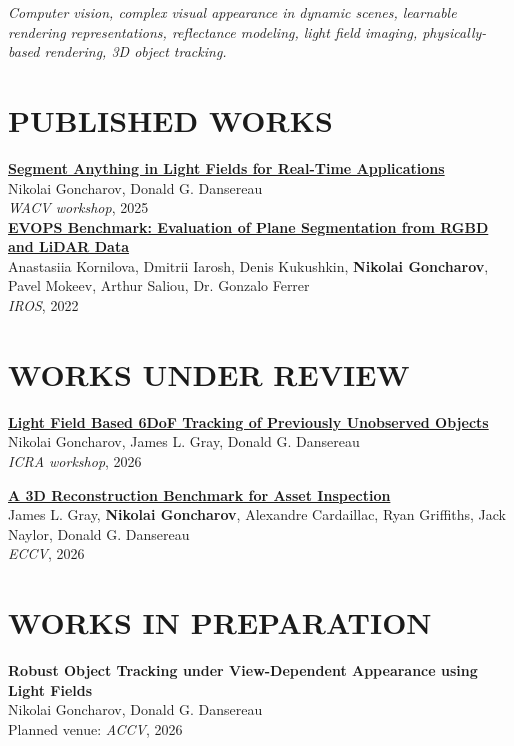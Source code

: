 \documentclass[11pt,a4paper]{article}
\begin{document}
\textit{Computer vision, complex visual appearance in dynamic scenes, learnable rendering representations, reflectance modeling, light field imaging, physically-based rendering, 3D object tracking.}

\section*{PUBLISHED WORKS}
\textbf{\href{https://openaccess.thecvf.com/content/WACV2025W/WACI/html/Goncharov_Segment_Anything_in_Light_Fields_for_Real-Time_Applications_via_Constrained_WACVW_2025_paper.html}{Segment Anything in Light Fields for Real-Time Applications}}\\
Nikolai Goncharov, Donald G. Dansereau\\
\textit{WACV workshop}, 2025\\

\textbf{\href{https://ieeexplore.ieee.org/abstract/document/9981470}{EVOPS Benchmark: Evaluation of Plane Segmentation from RGBD and LiDAR Data}}\\
Anastasiia Kornilova, Dmitrii Iarosh, Denis Kukushkin, \textbf{Nikolai Goncharov}, Pavel Mokeev, Arthur Saliou, Dr. Gonzalo Ferrer\\
\textit{IROS}, 2022

\section*{WORKS UNDER REVIEW}
\textbf{\href{https://arxiv.org/abs/2512.13007}{Light Field Based 6DoF Tracking of Previously Unobserved Objects}}\\
Nikolai Goncharov, James L. Gray, Donald G. Dansereau\\
\textit{ICRA workshop}, 2026

\textbf{\href{https://arxiv.org/abs/2603.17358}{A 3D Reconstruction Benchmark for Asset Inspection}}\\
James L. Gray, \textbf{Nikolai Goncharov}, Alexandre Cardaillac, Ryan Griffiths, Jack Naylor, Donald G. Dansereau\\
\textit{ECCV}, 2026\\

\section*{WORKS IN PREPARATION}
\textbf{Robust Object Tracking under View-Dependent Appearance using Light Fields}\\
Nikolai Goncharov, Donald G. Dansereau\\
Planned venue: \textit{ACCV}, 2026\\
\end{document}
